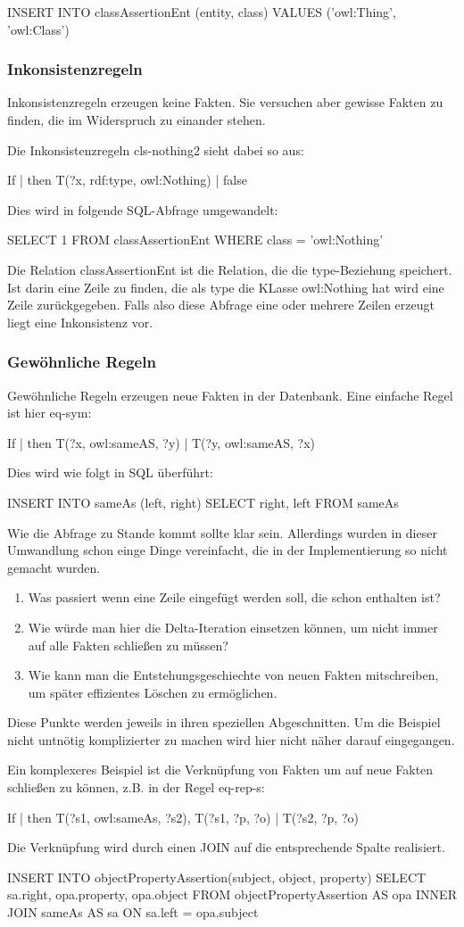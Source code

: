 INSERT INTO classAssertionEnt (entity, class)
	VALUES ('owl:Thing', 'owl:Class')

\subsubsection{Inkonsistenzregeln}
Inkonsistenzregeln erzeugen keine Fakten. Sie versuchen aber gewisse Fakten zu finden, die im Widerspruch zu einander stehen.

Die Inkonsistenzregeln cls-nothing2 sieht dabei so aus:

If | then
T(?x, rdf:type, owl:Nothing) | false

Dies wird in folgende SQL-Abfrage umgewandelt:

SELECT 1
FROM classAssertionEnt
WHERE class = 'owl:Nothing'

Die Relation classAssertionEnt ist die Relation, die die type-Beziehung speichert. Ist darin eine Zeile zu finden, die als type die KLasse owl:Nothing hat wird eine Zeile zurückgegeben. Falls also diese Abfrage eine oder mehrere Zeilen erzeugt liegt eine Inkonsistenz vor.

\subsubsection{Gewöhnliche Regeln}
Gewöhnliche Regeln erzeugen neue Fakten in der Datenbank. Eine einfache Regel ist hier eq-sym:

If | then
T(?x, owl:sameAS, ?y) | T(?y, owl:sameAS, ?x)

Dies wird wie folgt in SQL überführt:

INSERT INTO sameAs (left, right)
SELECT right, left
FROM sameAs

Wie die Abfrage zu Stande kommt sollte klar sein. Allerdings wurden in dieser Umwandlung schon einge Dinge vereinfacht, die in der Implementierung so nicht gemacht wurden.

\begin{enumerate}
  \item Was passiert wenn eine Zeile eingefügt werden soll, die schon enthalten ist?
  \item Wie würde man hier die Delta-Iteration einsetzen können, um nicht immer auf alle Fakten schließen zu müssen?
  \item Wie kann man die Entstehungsgeschiechte von neuen Fakten mitschreiben, um später effizientes Löschen zu ermöglichen.
\end{enumerate}

Diese Punkte werden jeweils in ihren speziellen Abgeschnitten. Um die Beispiel nicht untnötig komplizierter zu machen wird hier nicht näher darauf eingegangen.

Ein komplexeres Beispiel ist die Verknüpfung von Fakten um auf neue Fakten schließen zu können, z.B. in der Regel eq-rep-s:

If | then
T(?s1, owl:sameAs, ?s2), T(?s1, ?p, ?o) | T(?s2, ?p, ?o)

Die Verknüpfung wird durch einen JOIN auf die entsprechende Spalte realisiert.

INSERT INTO objectPropertyAssertion(subject, object, property)
SELECT sa.right, opa.property, opa.object
FROM objectPropertyAssertion AS opa
INNER JOIN sameAs AS sa
	ON sa.left = opa.subject